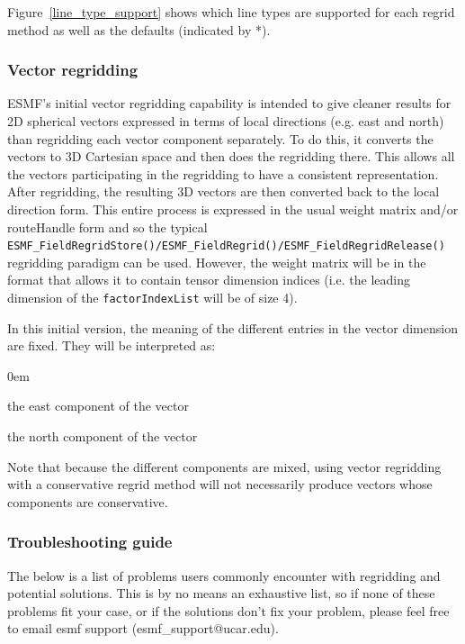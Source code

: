 Figure~\ref{line_type_support} shows which line types are supported for each regrid method as well as the defaults (indicated by *).


\subsubsection{Vector regridding}\label{sec::vectorRegrid}

ESMF's initial vector regridding capability is intended to give cleaner results for 2D spherical vectors expressed in
terms of local directions (e.g. east and north) than regridding each vector component separately. To do this, it
converts the vectors to 3D Cartesian space and then does the regridding there. This allows all the vectors participating in
the regridding to have a consistent representation. After regridding, the resulting 3D vectors are then converted
back to the local direction form. This entire process is expressed in the usual weight matrix and/or routeHandle form and so
the typical {\tt ESMF\_FieldRegridStore()/ESMF\_FieldRegrid()/ESMF\_FieldRegridRelease()} regridding paradigm can be used.
However, the weight matrix will be in the format that allows it to contain tensor dimension indices (i.e. the leading
dimension of the {\tt factorIndexList} will be of size 4). 

In this initial version, the meaning of the different entries in the vector dimension are fixed. They will be interpreted as:
\vspace{-1em}
\begin{description}
  \itemsep0em
  \item[1st entry] the east component of the vector
  \item[2nd entry] the north component of the vector
\end{description}

Note that because the different components are mixed, using vector regridding with a conservative regrid method will not necessarily produce vectors whose components are conservative. 


\subsubsection{Troubleshooting guide}

 The below is a list of problems users commonly encounter with regridding and potential solutions. 
 This is by no means an exhaustive list, so if none of these problems fit your case, or if the solutions
 don't fix your problem, please feel free to email esmf support (esmf\_support@ucar.edu).


